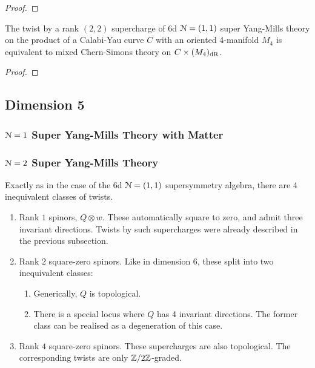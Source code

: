\documentclass[10pt, oneside]{article}
\begin{document}
\begin{proof}
 
\end{proof}

\begin{theorem} \label{6d_rk22_twist_thm}
The twist by a rank $(2,2)$ supercharge of 6d $\mathcal{N}=(1,1)$ super Yang-Mills theory on the product of a Calabi-Yau curve $C$ with an oriented 4-manifold $M_4$ is equivalent to mixed Chern-Simons theory on $C \times (M_4)_{\mathrm{dR}}$.
\end{theorem}

\begin{proof}
 
\end{proof}

\subsection{Dimension 5}

\subsubsection{$\mathcal{N} = 1$ Super Yang-Mills Theory with Matter}

\subsubsection{$\mathcal{N} = 2$ Super Yang-Mills Theory}

Exactly as in the case of the 6d $\mathcal{N}=(1,1)$ supersymmetry algebra, there are 4 inequivalent classes of twists.
\begin{enumerate}
 \item Rank $1$ spinors, $Q \otimes w$.  These automatically square to zero, and admit three invariant directions.  Twists by such supercharges were already described in the previous subsection.
 \item Rank $2$ square-zero spinors.  Like in dimension 6, these split into two inequivalent classes:
 \begin{enumerate}
 \item Generically, $Q$ is topological.
 \item There is a special locus where $Q$ has 4 invariant directions.  The former class can be realised as a degeneration of this case.
 \end{enumerate}
 \item Rank $4$ square-zero spinors.  These supercharges are also topological.  The corresponding twists are only $\mathbb Z/2\mathbb Z$-graded.
\end{enumerate}
\end{document}
